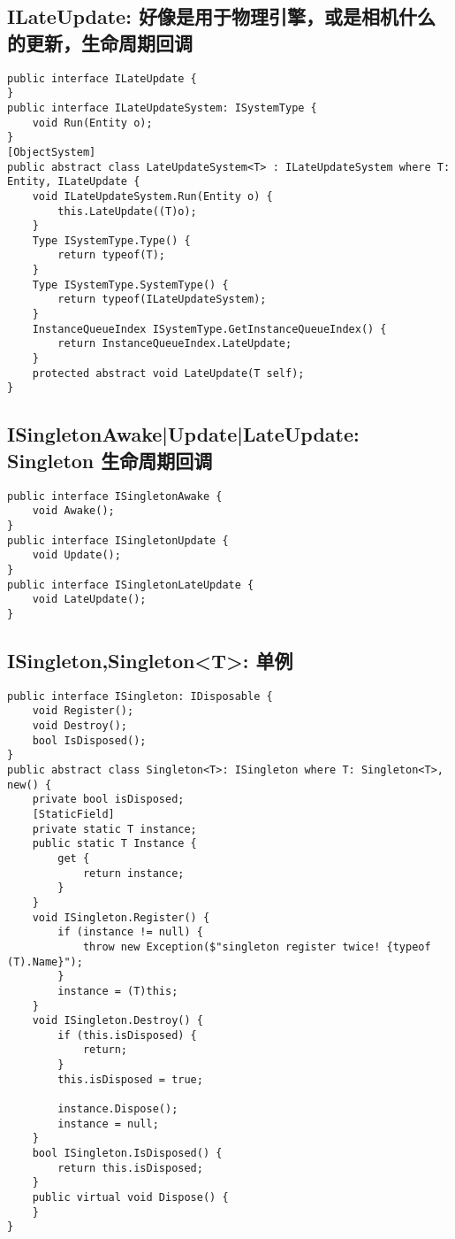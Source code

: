 \documentclass[9pt, b5paper]{article}
\begin{document}
\subsection{ILateUpdate: 好像是用于物理引擎，或是相机什么的更新，生命周期回调}
\label{sec-2-9}
\begin{verbatim}
public interface ILateUpdate {
}
public interface ILateUpdateSystem: ISystemType {
    void Run(Entity o);
}
[ObjectSystem]
public abstract class LateUpdateSystem<T> : ILateUpdateSystem where T: Entity, ILateUpdate {
    void ILateUpdateSystem.Run(Entity o) {
        this.LateUpdate((T)o);
    }
    Type ISystemType.Type() {
        return typeof(T);
    }
    Type ISystemType.SystemType() {
        return typeof(ILateUpdateSystem);
    }
    InstanceQueueIndex ISystemType.GetInstanceQueueIndex() {
        return InstanceQueueIndex.LateUpdate;
    }
    protected abstract void LateUpdate(T self);
}
\end{verbatim}
\subsection{ISingletonAwake|Update|LateUpdate: Singleton 生命周期回调}
\label{sec-2-10}
\begin{verbatim}
public interface ISingletonAwake {
    void Awake();
}
public interface ISingletonUpdate {
    void Update();
}
public interface ISingletonLateUpdate {
    void LateUpdate();
}
\end{verbatim}
\subsection{ISingleton,Singleton<T>: 单例}
\label{sec-2-11}
\begin{verbatim}
public interface ISingleton: IDisposable {
    void Register();
    void Destroy();
    bool IsDisposed();
}
public abstract class Singleton<T>: ISingleton where T: Singleton<T>, new() {
    private bool isDisposed;
    [StaticField]
    private static T instance;
    public static T Instance {
        get {
            return instance;
        }
    }
    void ISingleton.Register() {
        if (instance != null) {
            throw new Exception($"singleton register twice! {typeof (T).Name}");
        }
        instance = (T)this;
    }
    void ISingleton.Destroy() {
        if (this.isDisposed) {
            return;
        }
        this.isDisposed = true;

        instance.Dispose();
        instance = null;
    }
    bool ISingleton.IsDisposed() {
        return this.isDisposed;
    }
    public virtual void Dispose() {
    }
}
\end{verbatim}
\end{document}
